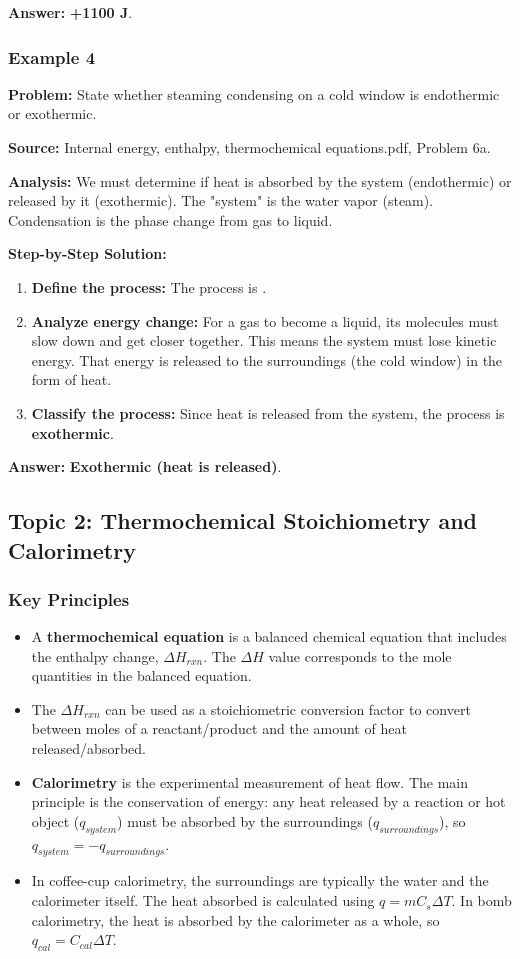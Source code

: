 \documentclass{article}
\begin{document}
\textbf{Answer:} \textbf{+1100 J}.

\subsubsection{Example 4}
\textbf{Problem:} State whether steaming condensing on a cold window is endothermic or exothermic.

\textbf{Source:} Internal energy, enthalpy, thermochemical equations.pdf, Problem 6a.

\textbf{Analysis:} We must determine if heat is absorbed by the system (endothermic) or released by it (exothermic). The "system" is the water vapor (steam). Condensation is the phase change from gas to liquid.

\textbf{Step-by-Step Solution:}
\begin{enumerate}
    \item \textbf{Define the process:} The process is .
    \item \textbf{Analyze energy change:} For a gas to become a liquid, its molecules must slow down and get closer together. This means the system must lose kinetic energy. That energy is released to the surroundings (the cold window) in the form of heat.
    \item \textbf{Classify the process:} Since heat is released from the system, the process is \textbf{exothermic}.
\end{enumerate}

\textbf{Answer:} \textbf{Exothermic (heat is released)}.

\subsection{Topic 2: Thermochemical Stoichiometry and Calorimetry}
\subsubsection{Key Principles}
\begin{itemize}
    \item A \textbf{thermochemical equation} is a balanced chemical equation that includes the enthalpy change, $\Delta H_{rxn}$. The $\Delta H$ value corresponds to the mole quantities in the balanced equation.
    \item The $\Delta H_{rxn}$ can be used as a stoichiometric conversion factor to convert between moles of a reactant/product and the amount of heat released/absorbed.
    \item \textbf{Calorimetry} is the experimental measurement of heat flow. The main principle is the conservation of energy: any heat released by a reaction or hot object ($q_{system}$) must be absorbed by the surroundings ($q_{surroundings}$), so $q_{system} = -q_{surroundings}$.
    \item In coffee-cup calorimetry, the surroundings are typically the water and the calorimeter itself. The heat absorbed is calculated using $q=mC_s\Delta T$. In bomb calorimetry, the heat is absorbed by the calorimeter as a whole, so $q_{cal} = C_{cal}\Delta T$.
\end{itemize}
\end{document}
